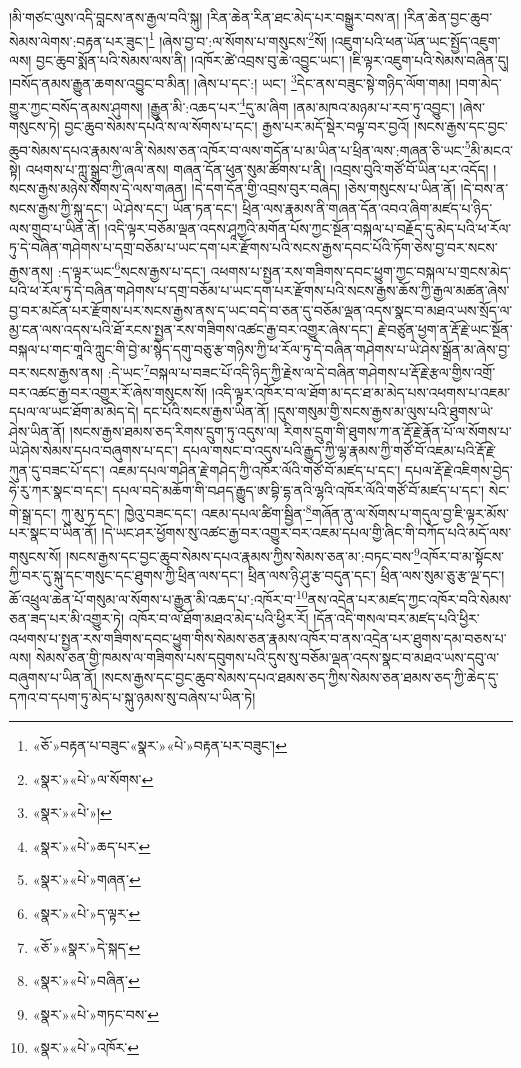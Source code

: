 །མི་གཙང་ལུས་འདི་བླངས་ནས་རྒྱལ་བའི་སྐུ། །རིན་ཆེན་རིན་ཐང་མེད་པར་བསྒྱུར་བས་ན། །རིན་ཆེན་བྱང་ཆུབ་སེམས་ལེགས་:བརྟན་པར་ཟུང་།\footnote{«ཅོ་»བརྟན་པ་བཟུང་«སྣར་»«པེ་»བརྟན་པར་བཟུང་།} །ཞེས་བྱ་བ་:ལ་སོགས་པ་གསུངས་\footnote{«སྣར་»«པེ་»ལ་སོགས་}སོ། །འཇུག་པའི་ཕན་ཡོན་ཡང་སྤྱོད་འཇུག་ལས། བྱང་ཆུབ་སྨོན་པའི་སེམས་ལས་ནི། །འཁོར་ཚེ་འབྲས་བུ་ཆེ་འབྱུང་ཡང་། །ཇི་ལྟར་འཇུག་པའི་སེམས་བཞིན་དུ། །བསོད་ནམས་རྒྱུན་ཆགས་འབྱུང་བ་མིན། །ཞེས་པ་དང་:། ཡང་། \footnote{«སྣར་»«པེ་»།  }དེང་ནས་བཟུང་སྟེ་གཉིད་ལོག་གམ། །བག་མེད་གྱུར་ཀྱང་བསོད་ནམས་ཤུགས། །རྒྱུན་མི་:འཆད་པར་\footnote{«སྣར་»«པེ་»ཆད་པར་}དུ་མ་ཞིག །ནམ་མཁའ་མཉམ་པ་རབ་ཏུ་འབྱུང་། །ཞེས་གསུངས་ཏེ། བྱང་ཆུབ་སེམས་དཔའི་ས་ལ་སོགས་པ་དང་། རྒྱས་པར་མདོ་སྡེར་བལྟ་བར་བྱའོ། །སངས་རྒྱས་དང་བྱང་ཆུབ་སེམས་དཔའ་རྣམས་ལ་ནི་སེམས་ཅན་འཁོར་བ་ལས་གདོན་པ་མ་ཡིན་པ་ཕྲིན་ལས་:གཞན་ཅི་ཡང་\footnote{«སྣར་»«པེ་»གཞན་}མི་མངའ་སྟེ། འཕགས་པ་ཀླུ་སྒྲུབ་ཀྱི་ཞལ་ནས། གཞན་དོན་ཕུན་སུམ་ཚོགས་པ་ནི། །འབྲས་བུའི་གཙོ་བོ་ཡིན་པར་འདོད། །སངས་རྒྱས་མཉེས་སོགས་དེ་ལས་གཞན། །དེ་དག་དོན་གྱི་འབྲས་བུར་བཞེད། །ཅེས་གསུངས་པ་ཡིན་ནོ། །དེ་བས་ན་སངས་རྒྱས་ཀྱི་སྐུ་དང་། ཡེ་ཤེས་དང་། ཡོན་ཏན་དང་། ཕྲིན་ལས་རྣམས་ནི་གཞན་དོན་འབའ་ཞིག་མཛད་པ་ཉིད་ལས་གྲུབ་པ་ཡིན་ནོ། །འདི་ལྟར་བཅོམ་ལྡན་འདས་ཤཱཀྱའི་མགོན་པོས་ཀྱང་སྔོན་བསྐལ་པ་བརྗོད་དུ་མེད་པའི་ཕ་རོལ་ཏུ་དེ་བཞིན་གཤེགས་པ་དགྲ་བཅོམ་པ་ཡང་དག་པར་རྫོགས་པའི་སངས་རྒྱས་དབང་པོའི་ཏོག་ཅེས་བྱ་བར་སངས་རྒྱས་ནས། :ད་ལྟར་ཡང་\footnote{«སྣར་»«པེ་»ད་ལྟར་}སངས་རྒྱས་པ་དང་། འཕགས་པ་སྤྱན་རས་གཟིགས་དབང་ཕྱུག་ཀྱང་བསྐལ་པ་གྲངས་མེད་པའི་ཕ་རོལ་ཏུ་དེ་བཞིན་གཤེགས་པ་དགྲ་བཅོམ་པ་ཡང་དག་པར་རྫོགས་པའི་སངས་རྒྱས་ཆོས་ཀྱི་རྒྱལ་མཚན་ཞེས་བྱ་བར་མངོན་པར་རྫོགས་པར་སངས་རྒྱས་ནས་ད་ཡང་བདེ་བ་ཅན་དུ་བཅོམ་ལྡན་འདས་སྣང་བ་མཐའ་ཡས་སྲོད་ལ་མྱ་ངན་ལས་འདས་པའི་ཐོ་རངས་སྤྱན་རས་གཟིགས་འཚང་རྒྱ་བར་འགྱུར་ཞེས་དང་། རྗེ་བཙུན་ཕྱག་ན་རྡོ་རྗེ་ཡང་སྔོན་བསྐལ་པ་གང་གཱའི་ཀླུང་གི་བྱེ་མ་སྙེད་དགུ་བཅུ་རྩ་གཉིས་ཀྱི་ཕ་རོལ་ཏུ་དེ་བཞིན་གཤེགས་པ་ཡེ་ཤེས་སྒྲོན་མ་ཞེས་བྱ་བར་སངས་རྒྱས་ནས། :དེ་ཡང་\footnote{«ཅོ་»«སྣར་»དེ་སྐད་}བསྐལ་པ་བཟང་པོ་འདི་ཉིད་ཀྱི་རྗེས་ལ་དེ་བཞིན་གཤེགས་པ་རྡོ་རྗེ་རྩལ་གྱིས་འགྲོ་བར་འཚང་རྒྱ་བར་འགྱུར་རོ་ཞེས་གསུངས་སོ། །འདི་ལྟར་འཁོར་བ་ལ་ཐོག་མ་དང་ཐ་མ་མེད་པས་འཕགས་པ་འཇམ་དཔལ་ལ་ཡང་ཐོག་མ་མེད་དེ། དང་པོའི་སངས་རྒྱས་ཡིན་ནོ། །དུས་གསུམ་གྱི་སངས་རྒྱས་མ་ལུས་པའི་ཐུགས་ཡེ་ཤེས་ཡིན་ནོ། །སངས་རྒྱས་ཐམས་ཅད་རིགས་དྲུག་ཏུ་འདུས་ལ། རིགས་དྲུག་གི་ཐུགས་ཀ་ན་རྡོ་རྗེ་རྣོན་པོ་ལ་སོགས་པ་ཡེ་ཤེས་སེམས་དཔའ་བཞུགས་པ་དང་། དཔལ་གསང་བ་འདུས་པའི་རྒྱུད་ཀྱི་ལྷ་རྣམས་ཀྱི་གཙོ་བོ་འཇམ་པའི་རྡོ་རྗེ་ཀུན་དུ་བཟང་པོ་དང་། འཇམ་དཔལ་གཤིན་རྗེ་གཤེད་ཀྱི་འཁོར་ལོའི་གཙོ་བོ་མཛད་པ་དང་། དཔལ་རྡོ་རྗེ་འཇིགས་བྱེད་ཧེ་རུ་ཀར་སྣང་བ་དང་། དཔལ་བདེ་མཆོག་གི་བཤད་རྒྱུད་ཨ་བྷི་དྷ་ནའི་ལྷའི་འཁོར་ལོའི་གཙོ་བོ་མཛད་པ་དང་། སེང་གེ་སྒྲ་དང་། ཀུ་མུ་ཏ་དང་། ཁྱེའུ་བཟང་དང་། འཇམ་དཔལ་ཚིག་སྦྱིན་\footnote{«སྣར་»«པེ་»བཞིན་}གཞོན་ནུ་ལ་སོགས་པ་གདུལ་བྱ་ཇི་ལྟར་མོས་པར་སྣང་བ་ཡིན་ནོ། །དེ་ཡང་ཤར་ཕྱོགས་སུ་འཚང་རྒྱ་བར་འགྱུར་བར་འཇམ་དཔལ་གྱི་ཞིང་གི་བཀོད་པའི་མདོ་ལས་གསུངས་སོ། །སངས་རྒྱས་དང་བྱང་ཆུབ་སེམས་དཔའ་རྣམས་ཀྱིས་སེམས་ཅན་མ་:བཏང་བས་\footnote{«སྣར་»«པེ་»གཏང་བས་}འཁོར་བ་མ་སྟོངས་ཀྱི་བར་དུ་སྐུ་དང་གསུང་དང་ཐུགས་ཀྱི་ཕྲིན་ལས་དང་། ཕྲིན་ལས་ཉི་ཤུ་རྩ་བདུན་དང་། ཕྲིན་ལས་སུམ་ཅུ་རྩ་ལྔ་དང་། ཆོ་འཕྲུལ་ཆེན་པོ་གསུམ་ལ་སོགས་པ་རྒྱུན་མི་འཆད་པ་:འཁོར་བ་\footnote{«སྣར་»«པེ་»འཁོར་}ནས་འདྲེན་པར་མཛད་ཀྱང་འཁོར་བའི་སེམས་ཅན་ཟད་པར་མི་འགྱུར་ཏེ། འཁོར་བ་ལ་ཐོག་མཐའ་མེད་པའི་ཕྱིར་རོ། །དོན་འདི་གསལ་བར་མཛད་པའི་ཕྱིར་འཕགས་པ་སྤྱན་རས་གཟིགས་དབང་ཕྱུག་གིས་སེམས་ཅན་རྣམས་འཁོར་བ་ནས་འདྲེན་པར་ཐུགས་དམ་བཅས་པ་ལས། སེམས་ཅན་གྱི་ཁམས་ལ་གཟིགས་པས་དབུགས་པའི་དུས་སུ་བཅོམ་ལྡན་འདས་སྣང་བ་མཐའ་ཡས་དབུ་ལ་བཞུགས་པ་ཡིན་ནོ། །སངས་རྒྱས་དང་བྱང་ཆུབ་སེམས་དཔའ་ཐམས་ཅད་ཀྱིས་སེམས་ཅན་ཐམས་ཅད་ཀྱི་ཆེད་དུ་དཀའ་བ་དཔག་ཏུ་མེད་པ་སྐུ་ཉམས་སུ་བཞེས་པ་ཡིན་ཏེ། 